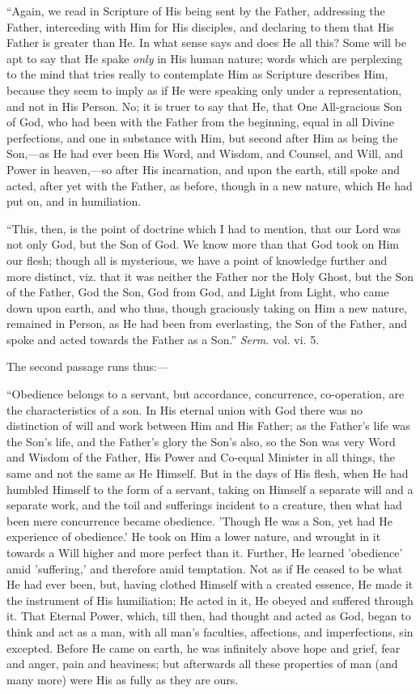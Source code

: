 ``Again, we read in Scripture of His being sent by the Father,
addressing the Father, interceding with Him for His disciples, and
declaring to them that His Father is greater than He. In what sense
says and does He all this? Some will be apt to say that He spake \emph{only}
in His human nature; words which are perplexing to the mind that tries
really to contemplate Him as Scripture describes Him, because they
seem to imply as if He were speaking only under a representation, and
not in His Person. No; it is truer to say that He, that One
All-gracious Son of God, who had been with the Father from the
beginning, equal in all Divine perfections, and one in substance with
Him, but second after Him as being the Son,—as He had ever been His
Word, and Wisdom, and Counsel, and Will, and Power in heaven,—so
after His incarnation, and upon the earth, still spoke and acted,
after yet with the Father, as before, though in a new nature, which He
had put on, and in humiliation.

``This, then, is the point of doctrine which I had to mention,
that our Lord was not only God, but the Son of God. We know more than
that God took on Him our flesh; though all is mysterious, we have a
point of knowledge further and more distinct, viz. that it was neither
the Father nor the Holy Ghost, but the Son of the Father, God the Son,
God from God, and Light from Light, who came down upon earth, and who
thus, though graciously taking on Him a new nature, remained in
Person, as He had been from everlasting, the Son of the Father, and
spoke and acted towards the Father as a Son.'' \emph{Serm}.
vol. vi. 5.

The second passage runs thus:—

``Obedience belongs to a servant, but accordance, concurrence,
co-operation, are the characteristics of a son. In His eternal union
with God there was no distinction of will and work between Him and His
Father; as the Father's life was the Son's life, and the Father's
glory the Son's also, so the Son was very Word and Wisdom of the
Father, His Power and Co-equal Minister in all things, the same and
not the same as He Himself. But in the days of His flesh, when He had
humbled Himself to the form of a servant, taking on Himself a separate
will and a separate work, and the toil and sufferings incident to a
creature, then what had been mere concurrence became obedience.
'Though He was a Son, yet had He experience of obedience.' He took on
Him a lower nature, and wrought in it towards a Will higher and more
perfect than it. Further, He learned 'obedience' amid 'suffering,' and
therefore amid temptation. Not as if He ceased to be what He had
ever been, but, having clothed Himself with a created essence, He made
it the instrument of His humiliation; He acted in it, He obeyed and
suffered through it. That Eternal Power, which, till then, had thought
and acted as God, began to think and act as a man, with all man's
faculties, affections, and imperfections, sin excepted. Before He came
on earth, he was infinitely above hope and grief, fear and anger, pain
and heaviness; but afterwards all these properties of man (and many
more) were His as fully as they are ours.

